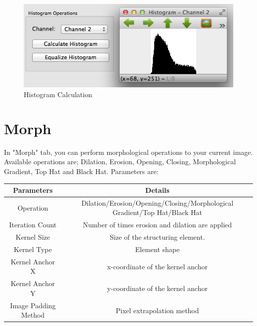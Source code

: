 \documentclass{article}
\begin{document}
\begin{figure}[H]
\begin{center}
\includegraphics[scale=0.8]{toolboxHistogram.png}
\caption{Histogram Calculation}
\end{center}
\end{figure}	

\section{Morph}

In "Morph" tab, you can perform morphological operations to your current image. Available operations are; Dilation, Erosion, Opening, Closing, Morphological Gradient, Top Hat and Black Hat. Parameters are:

\begin{table}[H]
\begin{center}
\begin{tabular}{|c|c|l|l|l|}
\hline
\textbf{Parameters}  & \multicolumn{4}{|c|}{\textbf{Details}}                                                          \\ \hline
Operation            & \multicolumn{4}{|c|}{Dilation/Erosion/Opening/Closing/Morphological Gradient/Top Hat/Black Hat} \\ \hline
Iteration Count      & \multicolumn{4}{|c|}{Number of times erosion and dilation are applied}                          \\ \hline
Kernel Size          & \multicolumn{4}{|c|}{Size of the structuring element.}                                          \\ \hline
Kernel Type          & \multicolumn{4}{|c|}{Element shape}                                                             \\ \hline
Kernel Anchor X      & \multicolumn{4}{|c|}{x-coordinate of the kernel anchor}                                         \\ \hline
Kernel Anchor Y      & \multicolumn{4}{|c|}{y-coordinate of the kernel anchor}                                         \\ \hline
Image Padding Method & \multicolumn{4}{|c|}{Pixel extrapolation method}                                                \\ \hline
\end{tabular}
\end{center}
\end{table}
\end{document}
